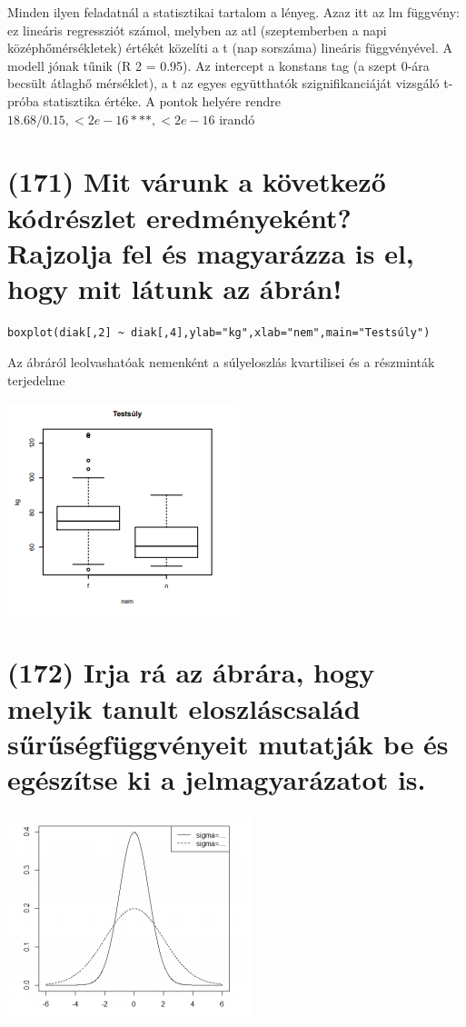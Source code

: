 \documentclass[12p]{article}
\begin{document}
Minden ilyen feladatnál a statisztikai tartalom a lényeg. Azaz itt az lm függvény: ez
lineáris regressziót számol, melyben az atl (szeptemberben a napi középhőmérsékletek) értékét közelíti a t (nap sorszáma) lineáris függvényével. A modell jónak tűnik (R
2 = 0.95). Az
intercept a konstans tag (a szept 0-ára becsült átlaghő mérséklet), a t az egyes együtthatók
szignifikanciáját vizsgáló t-próba statisztika értéke. A pontok helyére rendre $18.68/0.15, < 2e - 16 ***,
< 2e - 16$ irandó


\section{(171) Mit várunk a következő kódrészlet eredményeként? Rajzolja fel és magyarázza is el, hogy
mit látunk az ábrán!}

\begin{verbatim}
boxplot(diak[,2] ~ diak[,4],ylab="kg",xlab="nem",main="Testsúly")
\end{verbatim}

Az ábráról leolvashatóak nemenként a súlyeloszlás kvartilisei és a részminták terjedelme

\includegraphics{boxplot}

\section{(172) Irja rá az ábrára, hogy melyik tanult eloszláscsalád sűrűségfüggvényeit mutatják be és
egészítse ki a jelmagyarázatot is.}

\includegraphics{fuggveny}
\end{document}
